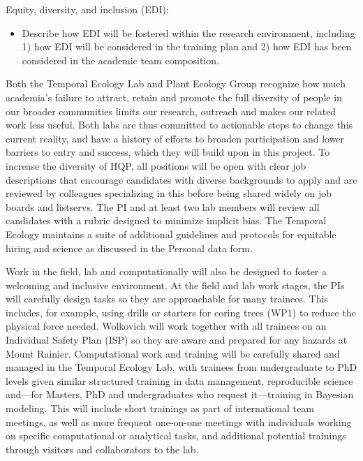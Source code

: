 \documentclass[12pt,oneside]{article}
\newenvironment{smitemize}{
\begin{itemize}
  \setlength{\itemsep}{1pt}
  \setlength{\parskip}{0pt}
  \setlength{\parsep}{0pt}}
{\end{itemize}
}
\begin{document}
{\sc Equity, diversity, and inclusion (EDI):}  %
\vspace{-1ex}
\begin{smitemize}
\item  Describe how EDI will be fostered within the research environment, including 1) how EDI will be considered in the training plan and 2) how EDI has been considered in the academic team composition.
\end{smitemize}
Both the Temporal Ecology Lab and Plant Ecology Group recognize how much academia's failure to attract, retain and promote the full diversity of people in our broader communities limits our research, outreach and makes our related work less useful. Both labs are thus committed to actionable steps to change this current reality, and have a history of efforts to broaden participation and lower barriers to entry and success, which they will build upon in this project. To increase the diversity of HQP, all positions will be open with clear job descriptions that encourage candidates with diverse backgrounds to apply and are reviewed by colleagues specializing in this before being shared widely on job boards and listservs.  The PI and at least two lab members will review all candidates with a rubric designed to minimize implicit bias. The Temporal Ecology maintains a suite of additional guidelines and protocols for equitable hiring and science as discussed in the Personal data form. %

Work in the field, lab and computationally will also be designed to foster a welcoming and inclusive environment. At the field and lab work stages, the PIs will carefully design tasks so they are approachable for many trainees. This includes, for example, using drills or starters for coring trees (WP1) to reduce the physical force needed.  Wolkovich will work together with all trainees on an Individual Safety Plan (ISP) so they are aware and prepared for any hazards at Mount Rainier.  Computational work and training will be carefully shared and managed in the Temporal Ecology Lab, with trainees from undergraduate to PhD levels given similar structured training in data management, reproducible science and---for Masters, PhD and undergraduates who request it---training in Bayesian modeling. This will include short trainings as part of international team meetings, as well as more frequent one-on-one meetings with individuals working on specific computational or analytical tasks, and additional potential trainings through visitors and collaborators to the lab. %
\end{document}
